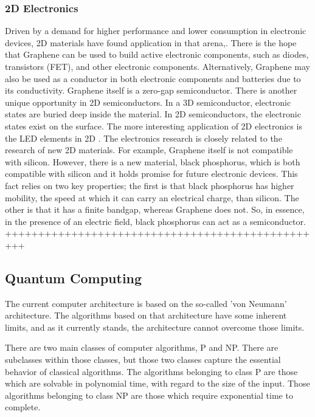 \subsubsection*{2D Electronics}
Driven by a demand for higher performance and lower consumption in electronic devices, 2D materials have found application in that arena\cite{2DEJour1},\cite{2DEJour2}. 
There is the hope that Graphene can be used to build active electronic components, such as diodes, transistors (FET), and other electronic components. Alternatively, Graphene may also be used as a conductor in both electronic components and batteries due to its conductivity. Graphene itself is a zero-gap semiconductor. There is another unique opportunity in 2D semiconductors. In a 3D semiconductor, electronic states are buried deep inside the material. 
In 2D semiconductors, the electronic states exist
on the surface. The more interesting application of 2D electronics is the LED elements in 2D \cite{2DLED}. The electronics research is closely related to the research of new 2D materials. For example, Graphene itself is not compatible with silicon. However, there is a new material, black phosphorus\cite{2DPhos}, which is both compatible with silicon and it holds promise for future electronic\cite{2DPhos3} devices. This fact relies on two key properties; the first is that black phosphorus has higher mobility,
the speed at which it can carry an electrical charge, than silicon. The other is that it has a finite bandgap, whereas Graphene does not. So, in essence, in the presence of an electric field, black phosphorus can act as a semiconductor\cite{2DPhos2}.
+++++++++++++++++++++++++++++++++++++++++++++++++
\subsection*{Quantum Computing}

The current computer architecture is based on the so-called 'von Neumann' architecture. The algorithms based on that architecture have some inherent limits, and as it currently stands, the architecture cannot overcome those limits.

There are two main  classes of computer algorithms, P and NP. There are subclasses within those classes, but those two classes capture the essential behavior of classical algorithms. The algorithms belonging to class P are those which are solvable in polynomial time, with regard to the size of the input. Those algorithms belonging to class NP are those which require exponential time to complete\cite{PvsNP}.

